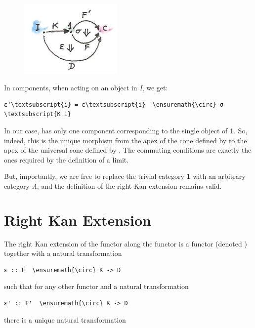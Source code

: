\begin{figure}[H]
\centering
\includegraphics[width=50mm]{images/kan5.jpg}
\end{figure}

\noindent
In components, when acting on an object  in \emph{I}, we get:

\begin{Verbatim}[commandchars=\\\{\}]
ε'\textsubscript{i} = ε\textsubscript{i}  \ensuremath{\circ} σ \textsubscript{K i}
\end{Verbatim}
In our case,  has only one component corresponding to the
single object of \textbf{1}. So, indeed, this is the unique morphism
from the apex of the cone defined by  to the apex of
the universal cone defined by . The commuting conditions
are exactly the ones required by the definition of a limit.

But, importantly, we are free to replace the trivial category \textbf{1}
with an arbitrary category \emph{A}, and the definition of the right Kan
extension remains valid.

\section{Right Kan Extension}\label{right-kan-extension}

The right Kan extension of the functor 
along the functor  is a functor
 (denoted ) together with a
natural transformation

\begin{Verbatim}[commandchars=\\\{\}]
ε :: F  \ensuremath{\circ} K -> D
\end{Verbatim}
such that for any other functor  and
a natural transformation

\begin{Verbatim}[commandchars=\\\{\}]
ε' :: F'  \ensuremath{\circ} K -> D
\end{Verbatim}
there is a unique natural transformation


